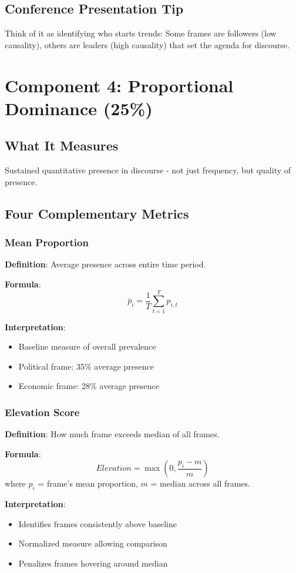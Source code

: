 \documentclass[11pt]{article}
\begin{document}
\subsection{Conference Presentation Tip}
Think of it as identifying who starts trends: Some frames are followers (low causality), others are leaders (high causality) that set the agenda for discourse.

\section{Component 4: Proportional Dominance (25\%)}

\subsection{What It Measures}
Sustained quantitative presence in discourse - not just frequency, but quality of presence.

\subsection{Four Complementary Metrics}

\subsubsection{Mean Proportion}
\textbf{Definition}: Average presence across entire time period.

\textbf{Formula}:
$$\bar{p}_i = \frac{1}{T} \sum_{t=1}^{T} p_{i,t}$$

\textbf{Interpretation}:
\begin{itemize}
    \item Baseline measure of overall prevalence
    \item Political frame: 35\% average presence
    \item Economic frame: 28\% average presence
\end{itemize}

\subsubsection{Elevation Score}
\textbf{Definition}: How much frame exceeds median of all frames.

\textbf{Formula}:
$$Elevation = \max\left(0, \frac{p_i - m}{m}\right)$$
where $p_i$ = frame's mean proportion, $m$ = median across all frames.

\textbf{Interpretation}:
\begin{itemize}
    \item Identifies frames consistently above baseline
    \item Normalized measure allowing comparison
    \item Penalizes frames hovering around median
\end{itemize}
\end{document}
